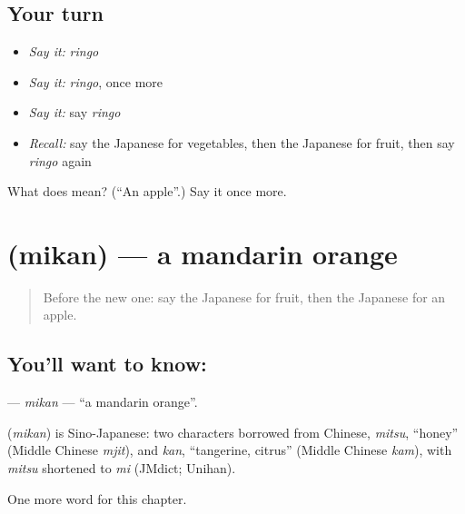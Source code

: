 \subsection*{Your turn}
\begin{itemize}
\raggedright
  \item \emph{Say it:} \emph{ringo}
  \item \emph{Say it:} \emph{ringo}, once more
  \item \emph{Say it:} say \emph{ringo}
  \item \emph{Recall:} say the Japanese for vegetables, then the Japanese for fruit, then say \emph{ringo} again
\end{itemize}

\begin{tcolorbox}[breakable,colback=teal!4,colframe=teal!35!black,title={Before you move on}]
What does  mean? (\textquotedblleft{}An apple\textquotedblright{}.) Say it once more.
\end{tcolorbox}
\section[\texorpdfstring{\ja{みかん} (mikan)}{みかん (mikan)}]{ (mikan) — a mandarin orange}

\label{lesson:JA-C33-mikan}



\begin{quote}
Before the new one: say the Japanese for fruit, then the Japanese for an apple.
\end{quote}

\subsection*{You'll want to know: }
\textbf{} — \emph{mikan} — \textquotedblleft{}a mandarin orange\textquotedblright{}.

\begin{cousinweb}
\textbf{} (\emph{mikan}) is Sino-Japanese: two characters borrowed from Chinese, \emph{mitsu}, \textquotedblleft{}honey\textquotedblright{} (Middle Chinese \emph{mjit}), and \emph{kan}, \textquotedblleft{}tangerine, citrus\textquotedblright{} (Middle Chinese \emph{kam}), with \emph{mitsu} shortened to \emph{mi} (JMdict; Unihan).
\end{cousinweb}

\begin{grammarlens}[title={What you've built}]
One more word for this chapter.
\end{grammarlens}

